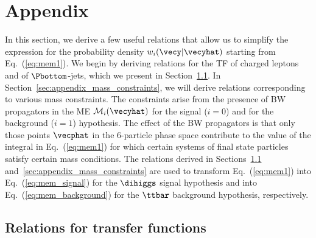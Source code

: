 \section{Appendix}
\label{sec:appendix}

In this section, we derive a few useful relations
that allow us to simplify the expression for the probability density $w_{i}(\vecy|\vecyhat)$ starting from Eq.~(\ref{eq:mem1}).
We begin by deriving relations for the TF of charged leptons and of $\Pbottom$-jets, which we present in Section~\ref{sec:appendix_TF}.
In Section~\ref{sec:appendix_mass_constraints}, 
we will derive relations corresponding to various mass constraints.
The constraints arise from the presence of BW propagators 
in the ME $\mathcal{M}_{i}(\vecyhat)$ for the signal ($i=0$) and for the background ($i=1$) hypothesis.
The effect of the BW propagators is that only those points $\vecphat$ in the $6$-particle phase space contribute to the value of the integral in Eq.~(\ref{eq:mem1})
for which certain systems of final state particles satisfy certain mass conditions.
The relations derived in Sections~\ref{sec:appendix_TF} and~\ref{sec:appendix_mass_constraints}
are used to transform Eq.~(\ref{eq:mem1}) 
into Eq.~(\ref{eq:mem_signal}) for the $\dihiggs$ signal hypothesis and 
into Eq.~(\ref{eq:mem_background}) for the $\ttbar$ background hypothesis, respectively.


\subsection{Relations for transfer functions}
\label{sec:appendix_TF}

